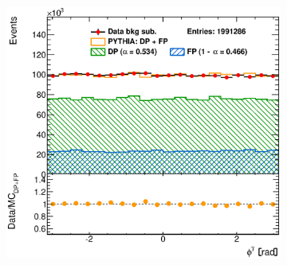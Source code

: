 \documentclass[12pt, twoside]{article}
\numberwithin{equation}{section}
\numberwithin{figure}{section}
\newenvironment{changemargin}[2]{%
\begin{list}{}{%
\setlength{\topsep}{0pt}%
\setlength{\leftmargin}{#1}%
\setlength{\rightmargin}{#2}%
\setlength{\listparindent}{\parindent}%
\setlength{\itemindent}{\parindent}%
\setlength{\parsep}{\parskip}%
}%
\item[]}{\end{list}}
\begin{document}
\begin{figure}[H]
\begin{changemargin}{-1.0cm}{-0.75cm}
\begin{changemargin}{-0.75cm}{-1.0cm}
\begin{subfigure}[b]{0.37\textwidth}
            \subcaption{}
            \label{fig:BSEtaPhotonPYTHIA_Optimised}
        \end{subfigure}
        \begin{subfigure}[b]{0.37\textwidth}
            \includegraphics[width=\textwidth]{./images/BackgroundSubtractedPythiaOptimised/OPT_SIG_EVENTS-103.eps}
            \subcaption{}
            \label{fig:BSPhiPhotonPYTHIA_Optimised}
        \end{subfigure}


\end{changemargin}
\end{changemargin}
\end{figure}
\end{document}
